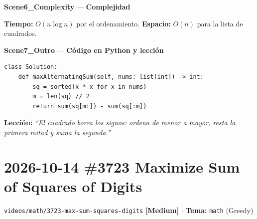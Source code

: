 \documentclass[letterpaper,10pt]{article}
\newcommand{\scene}[2]{\noindent\textbf{\textcolor{mcaqua}{#1}} --- \textbf{#2}\par\vspace{1pt}}
\newcommand{\folder}[1]{\texttt{\textcolor{mcgreen}{#1}}}
\newcommand{\badge}[2]{\textbf{\textcolor{#1}{[#2]}}}
\begin{document}
\begin{shaded}
\scene{Scene6\_Complexity}{Complejidad}
\textbf{Tiempo:} $O(n \log n)$ por el ordenamiento. \quad \textbf{Espacio:} $O(n)$ para la lista de cuadrados.
\end{shaded}

\scene{Scene7\_Outro}{C\'odigo en Python y lecci\'on}
\begin{Verbatim}[frame=single,fontsize=\small]
class Solution:
    def maxAlternatingSum(self, nums: list[int]) -> int:
        sq = sorted(x * x for x in nums)
        m = len(sq) // 2
        return sum(sq[m:]) - sum(sq[:m])
\end{Verbatim}
\textbf{Lecci\'on:} \textit{``El cuadrado borra los signos: ordena de menor a mayor, resta la primera mitad y suma la segunda.''}

\newpage

\section{2026-10-14 \textbar{} \#3723 Maximize Sum of Squares of Digits}
\folder{videos/math/3723-max-sum-squares-digits} \hfill \badge{mcgold}{Medium} $\cdot$ \textbf{Tema:} \texttt{math} (Greedy)
\end{document}

